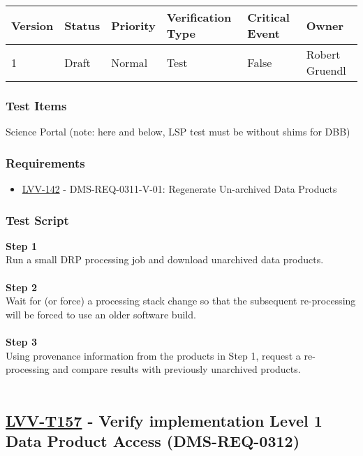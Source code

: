 \begin{longtable}[]{@{}llllll@{}}
\toprule
Version & Status & Priority & Verification Type & Critical Event &
Owner\tabularnewline
\midrule
\endhead
1 & Draft & Normal & Test & False & Robert Gruendl\tabularnewline
\bottomrule
\end{longtable}

\hypertarget{test-items-132}{%
\subsubsection{Test Items}\label{test-items-132}}

Science Portal (note: here and below, LSP test must be without shims for
DBB)

\hypertarget{requirements-133}{%
\subsubsection{Requirements}\label{requirements-133}}

\begin{itemize}
\tightlist
\item
  \href{https://jira.lsstcorp.org/browse/LVV-142}{LVV-142} -
  DMS-REQ-0311-V-01: Regenerate Un-archived Data Products
\end{itemize}

\hypertarget{test-script-133}{%
\subsubsection{Test Script}\label{test-script-133}}

\textbf{Step 1}\\
Run a small DRP processing job and download unarchived data products.\\
~\\
\textbf{Step 2}\\
Wait for (or force) a processing stack change so that the subsequent
re-processing will be forced to use an older software build.\\
~\\
\textbf{Step 3}\\
Using provenance information from the products in Step 1, request a
re-processing and compare results with previously unarchived products.\\
~\\

\hypertarget{lvv-t157---verify-implementation-level-1-data-product-access-dms-req-0312}{%
\subsection{\texorpdfstring{\href{https://jira.lsstcorp.org/secure/Tests.jspa\#/testCase/LVV-T157}{LVV-T157}
- Verify implementation Level 1 Data Product Access
(DMS-REQ-0312)}{LVV-T157 - Verify implementation Level 1 Data Product Access (DMS-REQ-0312)}}\label{lvv-t157---verify-implementation-level-1-data-product-access-dms-req-0312}}

